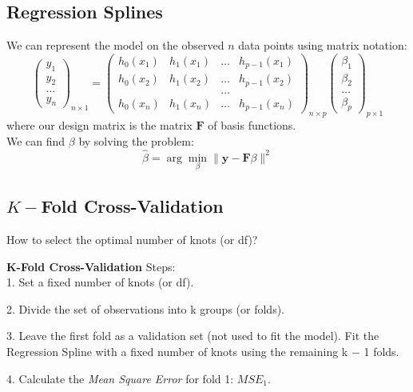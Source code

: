 \documentclass[11pt,a4paper]{article}
\begin{document}
\subsection{Regression Splines}
We can represent the model on the observed $n$ data points using matrix notation:
$$
\left(\begin{array}{l}
y_{1} \\
y_{2} \\
\ldots \\
y_{n}
\end{array}\right)_{n \times 1}=\left(\begin{array}{llll}
h_{0}\left(x_{1}\right) & h_{1}\left(x_{1}\right) & \ldots & h_{p-1}\left(x_{1}\right) \\
h_{0}\left(x_{2}\right) & h_{1}\left(x_{2}\right) & \ldots & h_{p-1}\left(x_{2}\right) \\
&&\ldots&\\
h_{0}\left(x_{n}\right) & h_{1}\left(x_{n}\right) & \ldots & h_{p-1}\left(x_{n}\right)
\end{array}\right)_{n \times p}\left(\begin{array}{l}
\beta_{1} \\
\beta_{2} \\
\ldots \\
\beta_{p}
\end{array}\right)_{p \times 1}
$$
where our design matrix is the matrix $\mathbf{F}$ of basis functions.\\
We can find $\beta$ by solving the problem:
$$
\hat{\beta}=\arg \min _{\beta}\|\mathbf{y}-\mathbf{F} \beta\|^{2}
$$

\subsection{$K-$Fold Cross-Validation}
\begin{center}
    How to select the optimal number of knots (or df)?
\end{center}
\textbf{K-Fold Cross-Validation} Steps:\\
1. Set a fixed number of knots (or df).

2. Divide the set of observations into k groups (or folds).

3. Leave the first fold as a validation set (not used to fit the model). Fit the Regression Spline with a fixed number of knots using the remaining k − 1 folds.

4. Calculate the \textit{Mean Square Error} for fold 1: ${MSE}_1$.
\end{document}
